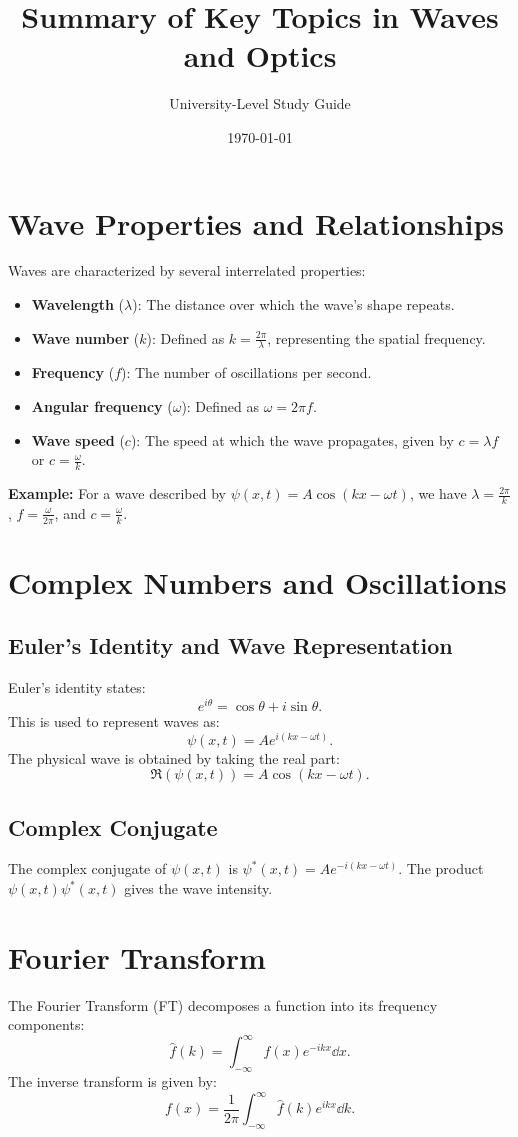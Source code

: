 \documentclass[a4paper, 12pt]{article}
\title{Summary of Key Topics in Waves and Optics}
\author{University-Level Study Guide}
\date{\today}
\begin{document}
\maketitle

\section{Wave Properties and Relationships}
Waves are characterized by several interrelated properties:
\begin{itemize}
    \item \textbf{Wavelength} ($\lambda$): The distance over which the wave's shape repeats.
    \item \textbf{Wave number} ($k$): Defined as $k = \frac{2\pi}{\lambda}$, representing the spatial frequency.
    \item \textbf{Frequency} ($f$): The number of oscillations per second.
    \item \textbf{Angular frequency} ($\omega$): Defined as $\omega = 2\pi f$.
    \item \textbf{Wave speed} ($c$): The speed at which the wave propagates, given by $c = \lambda f$ or $c = \frac{\omega}{k}$.
\end{itemize}
\textbf{Example:} For a wave described by $\psi(x,t) = A \cos(kx - \omega t)$, we have $\lambda = \frac{2\pi}{k}$, $f = \frac{\omega}{2\pi}$, and $c = \frac{\omega}{k}$.

\section{Complex Numbers and Oscillations}
\subsection{Euler's Identity and Wave Representation}
Euler's identity states:
\[ e^{i\theta} = \cos\theta + i\sin\theta. \]
This is used to represent waves as:
\[ \psi(x,t) = A e^{i(kx - \omega t)}. \]
The physical wave is obtained by taking the real part:
\[ \Re(\psi(x,t)) = A \cos(kx - \omega t). \]
\subsection{Complex Conjugate}
The complex conjugate of $\psi(x,t)$ is $\psi^*(x,t) = A e^{-i(kx - \omega t)}$. The product $\psi(x,t) \psi^*(x,t)$ gives the wave intensity.

\section{Fourier Transform}
The Fourier Transform (FT) decomposes a function into its frequency components:
\[ \hat{f}(k) = \int_{-\infty}^{\infty} f(x) e^{-ikx} \dd{x}. \]
The inverse transform is given by:
\[ f(x) = \frac{1}{2\pi} \int_{-\infty}^{\infty} \hat{f}(k) e^{ikx} \dd{k}. \]
\end{document}
